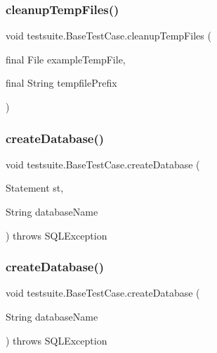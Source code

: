 \subsubsection{\texorpdfstring{cleanup\+Temp\+Files()}{cleanupTempFiles()}}
{\footnotesize\ttfamily void testsuite.\+Base\+Test\+Case.\+cleanup\+Temp\+Files (\begin{DoxyParamCaption}\item[{final File}]{example\+Temp\+File,  }\item[{final String}]{tempfile\+Prefix }\end{DoxyParamCaption})\hspace{0.3cm}{\ttfamily [protected]}}

\mbox{\label{classtestsuite_1_1_base_test_case_a19d73ebe2a92f5a1813d92d21fcd6431}} 
\subsubsection{\texorpdfstring{create\+Database()}{createDatabase()}\hspace{0.1cm}{\footnotesize\ttfamily [1/2]}}
{\footnotesize\ttfamily void testsuite.\+Base\+Test\+Case.\+create\+Database (\begin{DoxyParamCaption}\item[{Statement}]{st,  }\item[{String}]{database\+Name }\end{DoxyParamCaption}) throws S\+Q\+L\+Exception\hspace{0.3cm}{\ttfamily [protected]}}

\mbox{\label{classtestsuite_1_1_base_test_case_aea6308a3defd8463397b835996508c4e}} 
\subsubsection{\texorpdfstring{create\+Database()}{createDatabase()}\hspace{0.1cm}{\footnotesize\ttfamily [2/2]}}
{\footnotesize\ttfamily void testsuite.\+Base\+Test\+Case.\+create\+Database (\begin{DoxyParamCaption}\item[{String}]{database\+Name }\end{DoxyParamCaption}) throws S\+Q\+L\+Exception\hspace{0.3cm}{\ttfamily [protected]}}

